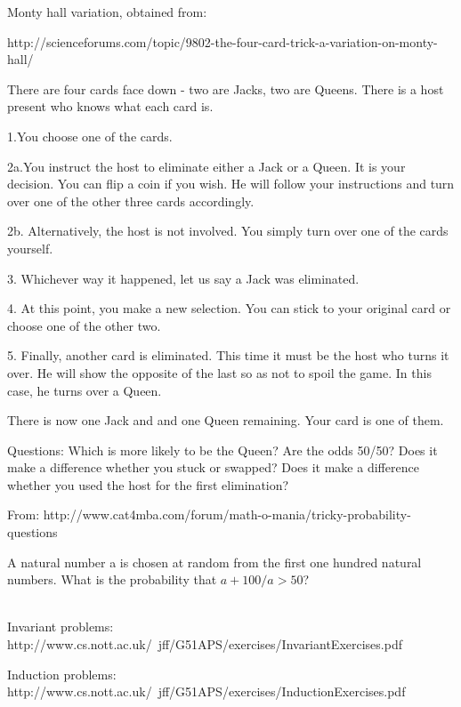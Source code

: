 \documentclass[12pt,oneside]{article}
\begin{document}
\newpage
\begin{problem}{10}
Monty hall variation, obtained from:

http://scienceforums.com/topic/9802-the-four-card-trick-a-variation-on-monty-hall/

There are four cards face down - two are Jacks, two are Queens. There is a host present who knows what each card is. 

1.You choose one of the cards.

2a.You instruct the host to eliminate either a Jack or a Queen. It is your decision. You can flip a coin if you wish. He will follow your instructions and turn over one of the other three cards accordingly.

2b. Alternatively, the host is not involved. You simply turn over one of the cards yourself. 

3. Whichever way it happened, let us say a Jack was eliminated.

4. At this point, you make a new selection. You can stick to your original card or choose one of the other two.

5. Finally, another card is eliminated. This time it must be the host who turns it over. He will show the opposite of the last so as not to spoil the game. In this case, he turns over a Queen.

There is now one Jack and and one Queen remaining. Your card is one of them.

Questions: Which is more likely to be the Queen? Are the odds 50/50? Does it make a difference whether you stuck or swapped? Does it make a difference whether you used the host for the first elimination?

\end{problem}

\newpage
\begin{problem}{10}

From: http://www.cat4mba.com/forum/math-o-mania/tricky-probability-questions

A natural number a is chosen at random from the first one hundred natural numbers. What is the probability that $a + 100/a > 50$?
\end{problem}

\newpage
\begin{problem}{10}
\\Invariant problems: http://www.cs.nott.ac.uk/~jff/G51APS/exercises/InvariantExercises.pdf

Induction problems: http://www.cs.nott.ac.uk/~jff/G51APS/exercises/InductionExercises.pdf
\end{problem}
\end{document}

